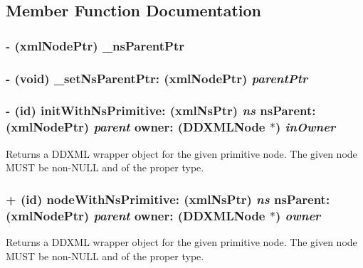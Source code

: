 \subsection{Member Function Documentation}
\hypertarget{class_d_d_x_m_l_namespace_node_a30f290015a446f18fb9c4c3e0dad9554}{
\subsubsection[{\_\-nsParentPtr}]{\setlength{\rightskip}{0pt plus 5cm}-\/ (xmlNodePtr) \_\-nsParentPtr }}
\label{class_d_d_x_m_l_namespace_node_a30f290015a446f18fb9c4c3e0dad9554}
\hypertarget{class_d_d_x_m_l_namespace_node_a1bbfe55192dcea58063347642356592f}{
\subsubsection[{\_\-setNsParentPtr:}]{\setlength{\rightskip}{0pt plus 5cm}-\/ (void) \_\-setNsParentPtr: (xmlNodePtr) {\em parentPtr}}}
\label{class_d_d_x_m_l_namespace_node_a1bbfe55192dcea58063347642356592f}
\hypertarget{class_d_d_x_m_l_namespace_node_a308384523e2f14d5640ababa5a945326}{
\subsubsection[{initWithNsPrimitive:nsParent:owner:}]{\setlength{\rightskip}{0pt plus 5cm}-\/ (id) initWithNsPrimitive: (xmlNsPtr) {\em ns}\/ nsParent: (xmlNodePtr) {\em parent}\/ owner: ({\bf DDXMLNode} $\ast$) {\em inOwner}}}
\label{class_d_d_x_m_l_namespace_node_a308384523e2f14d5640ababa5a945326}
Returns a DDXML wrapper object for the given primitive node. The given node MUST be non-\/NULL and of the proper type. \hypertarget{class_d_d_x_m_l_namespace_node_a38a7907e13c71da18d55662d21ca70fa}{
\subsubsection[{nodeWithNsPrimitive:nsParent:owner:}]{\setlength{\rightskip}{0pt plus 5cm}+ (id) nodeWithNsPrimitive: (xmlNsPtr) {\em ns}\/ nsParent: (xmlNodePtr) {\em parent}\/ owner: ({\bf DDXMLNode} $\ast$) {\em owner}}}
\label{class_d_d_x_m_l_namespace_node_a38a7907e13c71da18d55662d21ca70fa}
Returns a DDXML wrapper object for the given primitive node. The given node MUST be non-\/NULL and of the proper type. 

